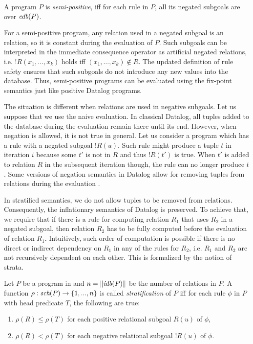 \begin{defn}
A \datalogneg program $P$ is \emph{semi-positive}, iff for each rule in $P$, all its negated subgoals are over $\textit{edb}(P)$.
\end{defn}

For a semi-positive program, any relation used in a negated subgoal is an \edb relation, so it is constant during the evaluation of $P$. Such subgoals can be interpreted in the immediate consequence operator as artificial negated \edb relations, i.e. $!R(x_1, \dots, x_k)$ holds iff $(x_1, \dots, x_k) \notin R$. The updated definition of rule safety ensures that such subgoals do not introduce any new values into the database. Thus, semi-positive programs can be evaluated using the fix-point semantics just like positive Datalog programs.

The situation is different when \idb relations are used in negative subgoals. Let us suppose that we use the naive evaluation. In classical Datalog, all tuples added to the database during the evaluation remain there until its end. However, when negation is allowed, it is not true in general. Let us consider a program which has a rule with a negated subgoal $!R(u)$. Such rule might produce a tuple $t$ in iteration $i$ because some $t'$ is not in $R$ and thus $!R(t')$ is true. When $t'$ is added to relation $R$ in the subsequent iteration though, the rule can no longer produce $t$. Some versions of negation semantics in Datalog allow for removing tuples from relations during the evaluation \cite{fod}.

In stratified semantics, we do not allow tuples to be removed from relations. Consequently, the inflationary semantics of Datalog is preserved. To achieve that, we require that if there is a rule for computing relation $R_1$ that uses $R_2$ in a negated subgoal, then relation $R_2$ has to be fully computed before the evaluation of relation $R_1$. Intuitively, such order of computation is possible if there is no direct or indirect dependency on $R_1$ in any of the rules for $R_2$, i.e. $R_1$ and $R_2$ are not recursively dependent on each other. This is formalized by the notion of strata.

\begin{defn}[Stratification]
Let $P$ be a program in \datalogneg and $n = \|\textit{idb}(P)\|$ be the number of \idb relations in $P$. A function $\rho : \textit{sch}(P) \to \{1, . . . , n\}$ is called \emph{stratification} of $P$ iff for each rule $\phi$ in $P$ with head predicate $T$, the following are true: 

\begin{enumerate}
\item $\rho(R) \le \rho(T)$ for each positive relational subgoal $R(u)$ of $\phi$,
\item $\rho(R) < \rho(T)$ for each negative relational subgoal $!R(u)$ of $\phi$.
\end{enumerate}
\end{defn}

